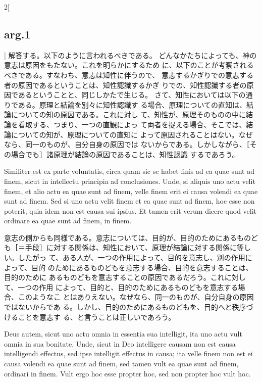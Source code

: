 \documentclass[paper=a4paper,fontsize=10pt,jafontsize=9pt,titlepage]{jlreq}
\begin{document}
\begin{paracol}{2}[\subsection{arg.1}]
解答する。以下のように言われるべきである。
どんなかたちによっても、神の意志は原因をもたない。これを明らかにするため
 に、以下のことが考察されるべきである。すなわち、意志は知性に伴うので、
 意志するかぎりでの意志する者の原因であるということは、知性認識するかぎ
 りでの、知性認識する者の原因であるということと、同じしかたで生じる。
さて、知性においては以下の通りである。原理と結論を別々に知性認識す
 る場合、原理についての直知は、結論についての知の原因である。これに対し
 て、知性が、原理そのものの中に結論を看取する、つまり、一つの直観によっ
 て両者を捉える場合、そこでは、結論についての知が、原理についての直知に
 よって原因されることはない。なぜなら、同一のものが、自分自身の原因では
 ないからである。しかしながら、［その場合でも］諸原理が結論の原因であることは、知性認識
 するであろう。

\switchcolumn*


Similiter est ex parte voluntatis, circa quam sic se habet
finis ad ea quae sunt ad finem, sicut in intellectu principia ad
conclusiones. Unde, si aliquis uno actu velit finem, et alio actu ea
quae sunt ad finem, velle finem erit ei causa volendi ea quae sunt ad
finem. Sed si uno actu velit finem et ea quae sunt ad finem, hoc esse
non poterit, quia idem non est causa sui ipsius. Et tamen erit verum
dicere quod velit ordinare ea quae sunt ad finem, in finem.

\switchcolumn

意志の側からも同様である。意志については、目的が、目的のためにあるものど
 も［＝手段］に対する関係は、知性において、原理が結論に対する関係に等しい。したがっ
 て、ある人が、一つの作用によって、目的を意志し、別の作用によって、目的
 のためにあるものどもを意志する場合、目的を意志することは、目的のために
 あるものどもを意志することの原因であるだろう。これに対して、一つの作用
 によって、目的と、目的のためにあるものどもを意志する場合、このようなこ
 とはありえない。なぜなら、同一のものが、自分自身の原因ではないからであ
 る。しかし、目的のためにあるものどもを、目的へと秩序づけることを意志す
 る、と言うことは正しいであろう。

\switchcolumn*


Deus autem,
sicut uno actu omnia in essentia sua intelligit, ita uno actu vult omnia
in sua bonitate. Unde, sicut in Deo intelligere causam non est causa
intelligendi effectus, sed ipse intelligit effectus in causa; ita velle
finem non est ei causa volendi ea quae sunt ad finem, sed tamen vult ea
quae sunt ad finem, ordinari in finem. Vult ergo hoc esse propter hoc,
sed non propter hoc vult hoc.


\end{paracol}
\end{document}
